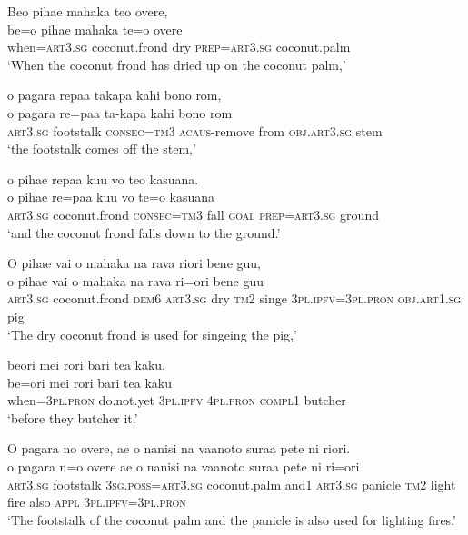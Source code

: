 \ea\label{ex:text01-112}
Beo pihae mahaka teo overe,\\
\gll be=o	pihae	mahaka	te=o	overe\\
     when=\textsc{art}3.\textsc{sg}	coconut.frond	dry	\textsc{prep}=\textsc{art}3.\textsc{sg}	coconut.palm\\
\glt `When the coconut frond has dried up on the coconut palm,'
\z

\ea\label{ex:text01-113}
o pagara repaa takapa kahi bono rom,\\
\gll o	pagara	re=paa	ta-kapa	kahi	bono	rom\\
     \textsc{art}3.\textsc{sg}	footstalk	\textsc{consec}=\textsc{tm}3	\textsc{acaus}-remove	from	\textsc{obj}.\textsc{art}3.\textsc{sg}	stem\\
\glt `the footstalk comes off the stem,'
\z

\ea\label{ex:text01-114}
o pihae repaa kuu vo teo kasuana.\\
\gll o	pihae	re=paa	kuu	vo	te=o	kasuana\\
     \textsc{art}3.\textsc{sg}	coconut.frond	\textsc{consec}=\textsc{tm}3	fall	\textsc{goal}	\textsc{prep}=\textsc{art}3.\textsc{sg}	ground\\
\glt `and the coconut frond falls down to the ground.'
\z

\ea\label{ex:text01-115}
O pihae vai o mahaka na rava riori bene guu,\\
\gll o	pihae	vai	o	mahaka	na	rava	ri=ori	bene	guu\\
     \textsc{art}3.\textsc{sg}	coconut.frond	\textsc{dem}6	\textsc{art}3.\textsc{sg}	dry	\textsc{tm}2	singe	3\textsc{pl}.\textsc{ipfv}=3\textsc{pl}.\textsc{pron}	\textsc{obj}.\textsc{art}1.\textsc{sg}	pig\\
\glt `The dry coconut frond is used for singeing the pig,'
\z

\ea\label{ex:text01-116}
beori mei rori bari tea kaku.\\
\gll be=ori	mei	rori	bari	tea	kaku\\
     when=3\textsc{pl}.\textsc{pron}	do.not.yet	3\textsc{pl}.\textsc{ipfv}	4\textsc{pl}.\textsc{pron}	\textsc{compl}1	butcher\\
\glt `before they butcher it.'
\z

\ea\label{ex:text01-117}
O pagara no overe, ae o nanisi na vaanoto suraa pete ni riori.\\
\gll o	pagara	n=o	overe	ae	o	nanisi	na	vaanoto	suraa	pete	ni	ri=ori\\
     \textsc{art}3.\textsc{sg}	footstalk	3\textsc{sg}.\textsc{poss}=\textsc{art}3.\textsc{sg}	coconut.palm	and1	\textsc{art}3.\textsc{sg}	panicle	\textsc{tm}2	light	fire	also	\textsc{appl}	3\textsc{pl}.\textsc{ipfv}=3\textsc{pl}.\textsc{pron}\\
\glt `The footstalk of the coconut palm and the panicle is also used for lighting fires.'
\z

